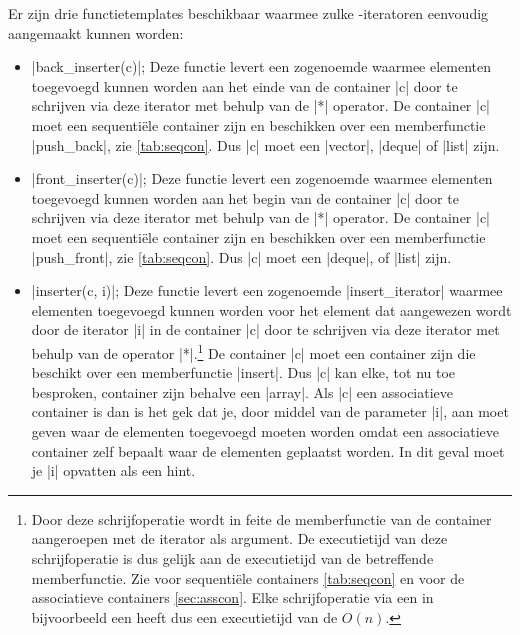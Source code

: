 \begin{cpplstShortInline}
Er zijn drie functietemplates beschikbaar waarmee zulke \hyp{}iteratoren eenvoudig aangemaakt kunnen worden:
\begin{itemize}
	\item |back_inserter(c)|; Deze functie levert een zogenoemde  waarmee elementen toegevoegd kunnen worden aan het einde van de container |c| door te schrijven via deze iterator met behulp van de |*| operator.
	De container |c| moet een sequentiële container zijn en beschikken over een  memberfunctie |push_back|, zie \cref{tab:seqcon}.
	Dus |c| moet een |vector|, |deque| of |list| zijn.
	\item |front_inserter(c)|; Deze functie levert een zogenoemde  waarmee elementen toegevoegd kunnen worden aan het begin van de container |c| door te schrijven via deze iterator met behulp van de |*| operator.
	De container |c| moet een sequentiële container zijn en beschikken over een  memberfunctie |push_front|, zie \cref{tab:seqcon}.
	Dus |c| moet een |deque|,  of |list| zijn.
	\item |inserter(c, i)|; Deze functie levert een zogenoemde |insert_iterator| waarmee elementen toegevoegd kunnen worden voor het element dat aangewezen wordt door de iterator |i| in de container |c| door te schrijven via deze iterator met behulp van de operator |*|.\footnote{%
		Door deze schrijfoperatie wordt in feite de memberfunctie  van de container  aangeroepen met de iterator  als argument.
		De executietijd van deze schrijfoperatie is dus gelijk aan de executietijd van de betreffende  memberfunctie.
		Zie voor sequentiële containers \cref{tab:seqcon} en voor de associatieve containers \cref{sec:asscon}.
		Elke schrijfoperatie via een  in bijvoorbeeld een  heeft dus een executietijd van de $O(n)$.
	} 
	De container |c| moet een container zijn die beschikt over een  memberfunctie |insert|.
	Dus |c| kan elke, tot nu toe besproken, container zijn behalve een |array|.
	Als |c| een associatieve container is dan is het gek dat je, door middel van de parameter |i|, aan moet geven waar de elementen toegevoegd moeten worden omdat een associatieve container zelf bepaalt waar de elementen geplaatst worden.
	In dit geval moet je |i| opvatten als een hint.
\end{itemize}


\end{cpplstShortInline}
